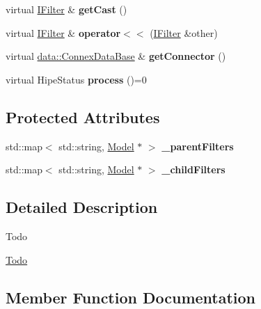 \begin{DoxyCompactItemize}
virtual \hyperlink{classfilter_1_1_i_filter}{I\+Filter} \& {\bfseries get\+Cast} ()
\item 
\mbox{\label{classfilter_1_1_i_filter_a9a683f58c2b38861f84a71185b7042a1}} 
virtual \hyperlink{classfilter_1_1_i_filter}{I\+Filter} \& {\bfseries operator$<$$<$} (\hyperlink{classfilter_1_1_i_filter}{I\+Filter} \&other)
\item 
\mbox{\label{classfilter_1_1_i_filter_afce54ff6662fa18ebfa5a17d6a915b87}} 
virtual \hyperlink{classfilter_1_1data_1_1_connex_data_base}{data\+::\+Connex\+Data\+Base} \& {\bfseries get\+Connector} ()
\item 
\mbox{\label{classfilter_1_1_i_filter_a62fe91f40b01cb886e923d8073392348}} 
virtual Hipe\+Status {\bfseries process} ()=0
\end{DoxyCompactItemize}
\subsection*{Protected Attributes}
\begin{DoxyCompactItemize}
\item 
\mbox{\label{classfilter_1_1_i_filter_a8fb81acc82a39393799f3d3e29861be2}} 
std\+::map$<$ std\+::string, \hyperlink{classfilter_1_1_model}{Model} $\ast$ $>$ {\bfseries \+\_\+parent\+Filters}
\item 
\mbox{\label{classfilter_1_1_i_filter_a4408ce375b706fb8e809417fccb4dbfe}} 
std\+::map$<$ std\+::string, \hyperlink{classfilter_1_1_model}{Model} $\ast$ $>$ {\bfseries \+\_\+child\+Filters}
\end{DoxyCompactItemize}


\subsection{Detailed Description}
\begin{DoxyRefDesc}{Todo}
\item[\hyperlink{todo__todo000027}{Todo}]\end{DoxyRefDesc}


\subsection{Member Function Documentation}
\mbox{\label{classfilter_1_1_i_filter_a3132d332ce814fda5c1a17a3e498c4fb}} 
